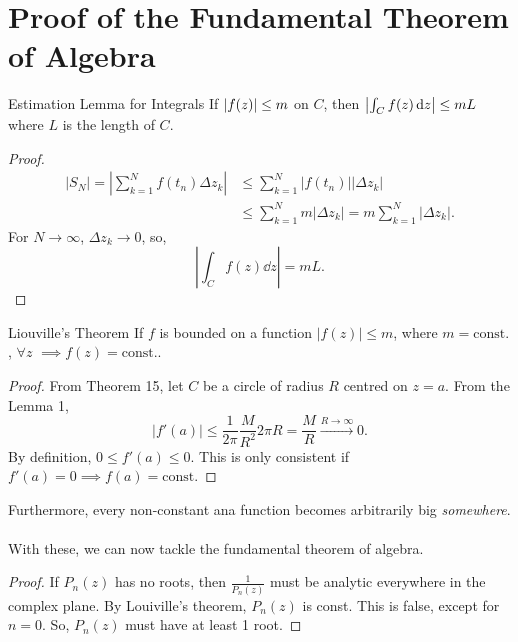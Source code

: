 \documentclass{book}
\begin{document}
\section{Proof of the Fundamental Theorem of Algebra}
\begin{Lemma}{Estimation Lemma for Integrals}{}
	If $\abs{f(z)} \leq m$ on $C$, then $\abs{\int_Cf(z)\dd{z}} \leq mL$ where $L$ is the length of $C$.
\end{Lemma}
\begin{proof}
	\begin{align}
	|S_N| = |\sum_{k=1}^Nf(t_n)\Delta z_k| & \leq \sum_{k=1}^N|f(t_n)||\Delta z_k| \\
	& \leq \sum_{k=1}^Nm|\Delta z_k| = m\sum_{k=1}^N|\Delta z_k|.
	\end{align}
	For $N \to \infty$, $\Delta z_k \to 0$, so,
	\begin{equation}
		|\int_C f(z) \dd{z}| = mL.
	\end{equation}
\end{proof}
\begin{Theorems}{Liouville's Theorem}{}
	If $f$ is bounded on a function $|f(z)| \leq m$, where $m = \text{const.}$, $\forall z$ $\implies f(z) = \text{const.}$.
\end{Theorems}
\begin{proof}
	From Theorem 15, let $C$ be a circle of radius $R$ centred on $z =a$. From the Lemma 1,
	\begin{equation}
		|f'(a)| \leq \frac{1}{2\pi}\frac{M}{R^2}2\pi R = \frac{M}{R}\xrightarrow{R \to \infty} 0.
	\end{equation}
	By definition, $0 \leq f'(a) \leq 0$. This is only consistent if $f'(a) = 0 \implies f(a) = \text{const.}$
\end{proof}
Furthermore, every non-constant ana function becomes arbitrarily big \textit{somewhere}.
\\\\
With these, we can now tackle the fundamental theorem of algebra.
\begin{proof}
	If $P_n(z)$ has no roots, then $\frac{1}{P_n(z)}$ must be analytic everywhere in the complex plane. By Louiville's theorem, $P_n(z)$ is const. This is false, except for $n = 0$. So, $P_n(z)$ must have at least 1 root.
\end{proof}
\end{document}

